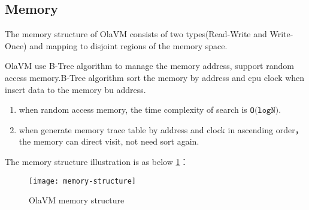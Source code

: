 \subsection{Memory}\label{subsec: ola-memory}
The memory structure of OlaVM consists of two types(Read-Write and Write-Once) and mapping to disjoint regions of the memory space.
\begin{table}[!ht]
    \caption{Instruction set}
    \label{table:instruction-set}
\end{table}


OlaVM use B-Tree algorithm to manage the memory address, support random access memory.B-Tree algorithm sort the memory by address and cpu clock when insert data to the memory bu address.
\begin{enumerate}
    \item when random access memory, the time complexity of search is $\texttt{O(logN)}$.
    \item when generate memory trace table by address and clock in ascending order，the memory can direct visit, not need sort again.
\end{enumerate}

The memory structure illustration is as below \ref{fig: B-tree-memory}：
\begin{figure}[!htp]
    \centering
    \texttt{[image: memory-structure]}
    \caption{OlaVM memory structure}
    \label{fig: B-tree-memory}
\end{figure}